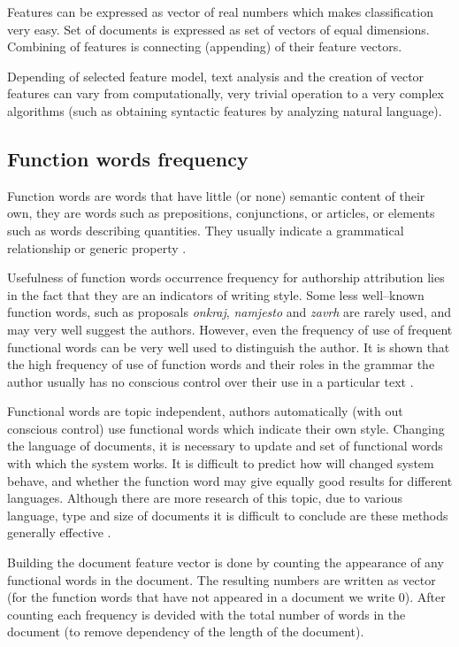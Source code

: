 \documentclass[11pt,english]{article}
\begin{document}
\begin{multicols}{2}
Features can be expressed as vector of real numbers which makes classification
very easy. Set of documents is expressed as set of vectors of equal dimensions.
Combining of features is connecting (appending) of their feature vectors.

Depending of selected feature model, text analysis and the creation of vector
features can vary from computationally, very trivial operation to a very complex
algorithms (such as obtaining syntactic features by analyzing natural language).


\subsection{Function words frequency}
\label{sec:funkcijske-rijeci}
Function words are words that have little (or none) semantic content of their
own, they are words such as prepositions, conjunctions, or articles, or elements
such as words describing quantities. They usually indicate a grammatical
relationship or generic property \citep{zhao2005effective}.

Usefulness of function words occurrence frequency for authorship attribution
lies in the fact that they are an indicators of writing style. Some
less well--known function words, such as proposals \emph{onkraj},
\emph{namjesto} and \emph{zavrh} are rarely used, and may very well
suggest the authors. However, even the frequency of use of frequent
functional words can be very well used to distinguish the author. It is shown
that the high frequency of use of function words and their roles in the grammar
the author usually has no conscious control over their use in a particular text
\citep{argamon2005measuring}.

Functional words are topic independent, authors automatically (with out conscious
control) use functional words which indicate their own style. Changing the
language of documents, it is necessary to update and set of functional words with
which the system works. It is difficult to predict how will changed system
behave, and whether the function word may give equally good results for different
languages. Although there are more research of this topic, due to various
language, type and size of documents it is difficult to conclude are these
methods generally effective \citep{zhao2005effective}.

Building the document feature vector is done by counting the appearance of any
functional words in the document. The resulting numbers are written as vector
(for the function words that have not appeared in a document we write 0). After
counting each frequency is devided with the total number of words in the document
(to remove dependency of the length of the document).


\end{multicols}
\end{document}
